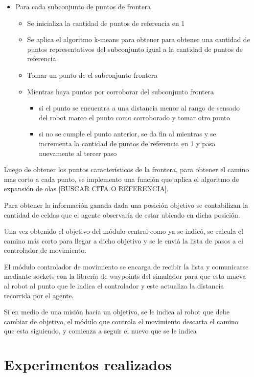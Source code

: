 \documentclass[runningheads]{llncs}
\begin{document}
\begin{itemize}
	\item Para cada subconjunto de puntos de frontera
	\begin{itemize}
		\item Se inicializa la cantidad de puntos de referencia en 1
		\item Se aplica el algoritmo k-means para obtener para obtener una cantidad de puntos representativos del subconjunto igual a la cantidad de puntos de referencia
		\item Tomar un punto de el subconjunto frontera
		\item Mientras haya puntos por corroborar del subconjunto frontera
		\begin{itemize}
			\item si el punto se encuentra a una distancia menor al rango de sensado del robot
			marco el punto como corroborado y tomar otro punto
			\item si no se cumple el punto anterior, se da fin al mientras y se incrementa la cantidad de puntos de referencia en 1 y pasa nuevamente al tercer paso
		\end{itemize}
	\end{itemize}
\end{itemize}

Luego de obtener los puntos característicos de la frontera, para obtener el camino mas corto a cada punto, se implemento una función que aplica el algoritmo de expansión de olas [BUSCAR CITA O REFERENCIA]. 

Para obtener la información ganada dada una posición objetivo se contabilizan la cantidad de celdas que el agente observaría de estar ubicado en dicha posición.

Una vez obtenido el objetivo del módulo central como ya se indicó, se calcula el camino más corto para llegar a dicho objetivo y se le enviá la lista de pasos a el controlador de movimiento. 

El módulo controlador de movimiento se encarga de recibir la lista y comunicarse mediante sockets con la librería de waypoints del simulador para que esta mueva al robot al punto que le indica el controlador y este actualiza la distancia recorrida por el agente.

Si en medio de una misión hacia un objetivo, se le indica al robot que debe cambiar de objetivo, el módulo que controla el movimiento descarta el camino que esta siguiendo, y comienza a seguir el nuevo que se le indica

\section{Experimentos realizados}
\end{document}
